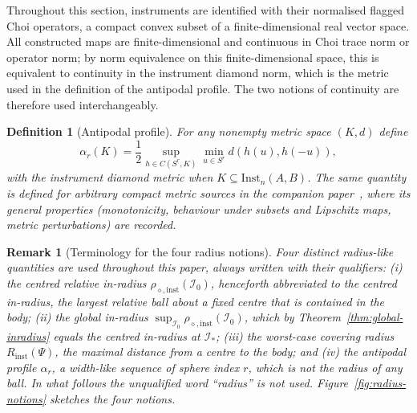 \documentclass[11pt,a4paper]{article}
\newtheorem{definition}[theorem]{Definition}
\newtheorem{remark}[theorem]{Remark}
\newcommand{\Inst}{\mathrm{Inst}}
\begin{document}
Throughout this section, instruments are identified with their normalised flagged Choi operators, a compact convex subset of a finite-dimensional real vector space. All constructed maps are finite-dimensional and continuous in Choi trace norm or operator norm; by norm equivalence on this finite-dimensional space, this is equivalent to continuity in the instrument diamond norm, which is the metric used in the definition of the antipodal profile. The two notions of continuity are therefore used interchangeably.

\begin{definition}[Antipodal profile]
\label{def:alpha}
For any nonempty metric space $(K,d)$ define
\[
\alpha_r(K)=\frac12\sup_{h\in C(S^r,K)}\min_{u\in S^r}d(h(u),h(-u)),
\]
with the instrument diamond metric when $K\subseteq\Inst_n(A,B)$. The same quantity is defined for arbitrary compact metric sources in the companion paper~\cite{CompanionChannels}, where its general properties (monotonicity, behaviour under subsets and Lipschitz maps, metric perturbations) are recorded.
\end{definition}

\begin{remark}[Terminology for the four radius notions]
\label{rem:radius-terminology}
Four distinct radius-like quantities are used throughout this paper, always written with their qualifiers: (i) the \emph{centred relative in-radius} $\rho_{\diamond,\mathrm{inst}}(\mathcal I_0)$, henceforth abbreviated to the centred in-radius, the largest relative ball about a fixed centre that is contained in the body; (ii) the \emph{global in-radius} $\sup_{\mathcal I_0}\rho_{\diamond,\mathrm{inst}}(\mathcal I_0)$, which by Theorem~\ref{thm:global-inradius} equals the centred in-radius at $\mathcal I_*$; (iii) the \emph{worst-case covering radius} $R_{\mathrm{inst}}(\Psi)$, the maximal distance from a centre to the body; and (iv) the \emph{antipodal profile} $\alpha_r$, a width-like sequence of sphere index $r$, which is not the radius of any ball. In what follows the unqualified word ``radius'' is not used. Figure~\ref{fig:radius-notions} sketches the four notions.
\end{remark}
\end{document}
